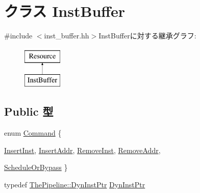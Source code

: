 \hypertarget{classInstBuffer}{
\section{クラス InstBuffer}
\label{classInstBuffer}
}


{\ttfamily \#include $<$inst\_\-buffer.hh$>$}InstBufferに対する継承グラフ:\begin{figure}[H]
\begin{center}
\leavevmode
\includegraphics[height=2cm]{classInstBuffer}
\end{center}
\end{figure}
\subsection*{Public 型}
\begin{DoxyCompactItemize}
\item 
enum \hyperlink{classInstBuffer_a2afce0a47a93eee73a314d53e4890153}{Command} \{ \par
\hyperlink{classInstBuffer_a2afce0a47a93eee73a314d53e4890153a9923cb8ed2504b9ad0ef7d8c098de927}{InsertInst}, 
\hyperlink{classInstBuffer_a2afce0a47a93eee73a314d53e4890153a479d267bb3346d48813042a220b9bf33}{InsertAddr}, 
\hyperlink{classInstBuffer_a2afce0a47a93eee73a314d53e4890153af554d4e266ed08f9ba5b04e52ecf54b1}{RemoveInst}, 
\hyperlink{classInstBuffer_a2afce0a47a93eee73a314d53e4890153a1ab75403b8653ee6fa0ff346e37763c4}{RemoveAddr}, 
\par
\hyperlink{classInstBuffer_a2afce0a47a93eee73a314d53e4890153a828036f61bf534c1970ea8bc390c096a}{ScheduleOrBypass}
 \}
\item 
typedef \hyperlink{classRefCountingPtr}{ThePipeline::DynInstPtr} \hyperlink{classInstBuffer_af9d0c8a46736ba6aa2d8bb94da1a5e73}{DynInstPtr}
\end{DoxyCompactItemize}
